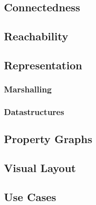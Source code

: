 \subsection{Connectedness}

\subsection{Reachability}

\subsection{Representation}
\subsubsection{Marshalling}
\subsubsection{Datastructures}

\subsection{Property Graphs}

\subsection{Visual Layout}

\subsection{Use Cases}

\begin{itemize}
\end{itemize}

